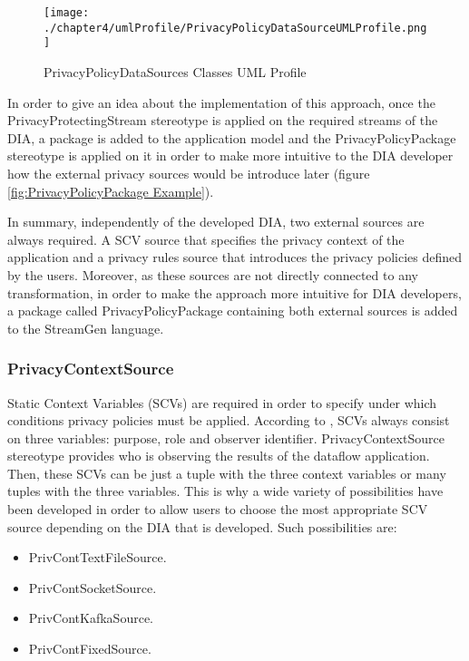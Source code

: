 \begin{figure}
\centering
{\texttt{[image: ./chapter4/umlProfile/PrivacyPolicyDataSourceUMLProfile.png]}}
\caption{PrivacyPolicyDataSources Classes UML Profile}
\label{fig:PrivacyPolicyDataSources Classes UML Profile}
\end{figure}

In order to give an idea about the implementation of this approach, once the PrivacyProtectingStream stereotype is applied on the required streams of the DIA, a package is added to the application model and the PrivacyPolicyPackage stereotype is applied on it in order to make more intuitive to the DIA developer how the external privacy sources would be introduce later (figure \ref{fig:PrivacyPolicyPackage Example}).

In summary, independently of the developed DIA, two external sources are always required. A SCV source that specifies the privacy context of the application and a privacy rules source that introduces the privacy policies defined by the users. Moreover, as these sources are not directly connected to any transformation, in order to make the approach more intuitive for DIA developers, a package called PrivacyPolicyPackage containing both external sources is added to the StreamGen language.

\subsubsection{PrivacyContextSource}

Static Context Variables (SCVs) are required in order to specify under which conditions privacy policies must be applied. According to \cite{privacypoliciesarticle}, SCVs always consist on three variables: purpose, role and observer identifier. PrivacyContextSource stereotype provides who is observing the results of the dataflow application. Then, these SCVs can be just a tuple with the three context variables or many tuples with the three variables. This is why a wide variety of possibilities have been developed in order to allow users to choose the most appropriate SCV source depending on the DIA that is developed. Such possibilities are:

\begin{itemize}
\item PrivContTextFileSource.
\item PrivContSocketSource.
\item PrivContKafkaSource.
\item PrivContFixedSource.
\end{itemize}

